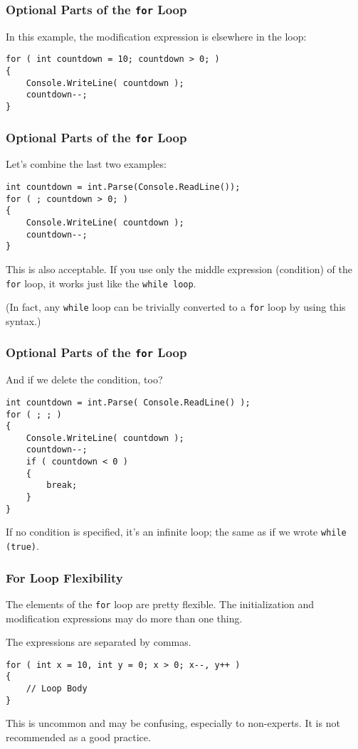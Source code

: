 \begin{frame}[fragile]
\frametitle{Optional Parts of the \texttt{for} Loop}

In this example, the modification expression is elsewhere in the loop:

\begin{verbatim}
for ( int countdown = 10; countdown > 0; )
{
    Console.WriteLine( countdown );
    countdown--;
}
\end{verbatim}

\end{frame}

\begin{frame}[fragile]
\frametitle{Optional Parts of the \texttt{for} Loop}

Let's combine the last two examples:

\begin{verbatim}
int countdown = int.Parse(Console.ReadLine());
for ( ; countdown > 0; )
{
    Console.WriteLine( countdown );
    countdown--;
}
\end{verbatim}

This is also acceptable. If you use only the middle expression (condition) of the \texttt{for} loop, it works just like the \texttt{while loop}.

(In fact, any \texttt{while} loop can be trivially converted to a \texttt{for} loop by using this syntax.)

\end{frame}

\begin{frame}[fragile]
\frametitle{Optional Parts of the \texttt{for} Loop}

And if we delete the condition, too?

\begin{verbatim}
int countdown = int.Parse( Console.ReadLine() );
for ( ; ; )
{
    Console.WriteLine( countdown );
    countdown--;
    if ( countdown < 0 )
    {
        break;
    }    
}
\end{verbatim}

If no condition is specified, it's an infinite loop; the same as if we wrote \texttt{while (true)}.

\end{frame}

\begin{frame}[fragile]
\frametitle{For Loop Flexibility}

The elements of the \texttt{for} loop are pretty flexible. The initialization and modification expressions may do more than one thing.

The expressions are separated by commas.

\begin{verbatim}
for ( int x = 10, int y = 0; x > 0; x--, y++ )
{
    // Loop Body
}
\end{verbatim}

This is uncommon and may be confusing, especially to non-experts. It is not recommended as a good practice.

\end{frame}

